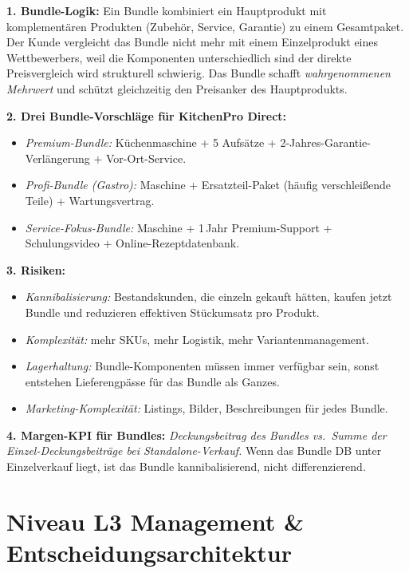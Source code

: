 \documentclass[11pt,a4paper,oneside]{article}
\begin{document}
\begin{loesungbox}
\textbf{1. Bundle-Logik:}
Ein Bundle kombiniert ein Hauptprodukt mit komplementären Produkten (Zubehör, Service, Garantie) zu einem Gesamtpaket. Der Kunde vergleicht das Bundle nicht mehr mit einem Einzelprodukt eines Wettbewerbers, weil die Komponenten unterschiedlich sind \textendash{} der direkte Preisvergleich wird strukturell schwierig. Das Bundle schafft \emph{wahrgenommenen Mehrwert} und schützt gleichzeitig den Preisanker des Hauptprodukts.

\textbf{2. Drei Bundle-Vorschläge für KitchenPro Direct:}
\begin{itemize}
  \item \emph{Premium-Bundle:} Küchenmaschine + 5 Aufsätze + 2-Jahres-Garantie-Verlängerung + Vor-Ort-Service.
  \item \emph{Profi-Bundle (Gastro):} Maschine + Ersatzteil-Paket (häufig verschleißende Teile) + Wartungsvertrag.
  \item \emph{Service-Fokus-Bundle:} Maschine + 1\,Jahr Premium-Support + Schulungsvideo + Online-Rezeptdatenbank.
\end{itemize}

\textbf{3. Risiken:}
\begin{itemize}
  \item \emph{Kannibalisierung:} Bestandskunden, die einzeln gekauft hätten, kaufen jetzt Bundle und reduzieren effektiven Stückumsatz pro Produkt.
  \item \emph{Komplexität:} mehr SKUs, mehr Logistik, mehr Variantenmanagement.
  \item \emph{Lagerhaltung:} Bundle-Komponenten müssen immer verfügbar sein, sonst entstehen Lieferengpässe für das Bundle als Ganzes.
  \item \emph{Marketing-Komplexität:} Listings, Bilder, Beschreibungen für jedes Bundle.
\end{itemize}

\textbf{4. Margen-KPI für Bundles:}
\emph{Deckungsbeitrag des Bundles vs.\ Summe der Einzel-Deckungsbeiträge bei Standalone-Verkauf.} Wenn das Bundle DB unter Einzelverkauf liegt, ist das Bundle kannibalisierend, nicht differenzierend.
\end{loesungbox}

\clearpage

\section*{Niveau L3 \textendash{} Management \& Entscheidungsarchitektur}
\end{document}
